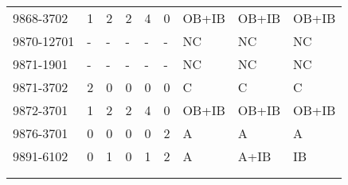 \begin{longtable}{p{2.1cm}p{0.8cm}p{0.8cm}p{0.8cm}p{0.8cm}p{0.8cm}p{1.5cm}p{1.5cm}p{1.2cm}}
9868-3702 & 1 & 2 & 2 & 4 & 0 & OB+IB & OB+IB & OB+IB \\
9870-12701 & - & - & - & - & - & NC & NC & NC \\
9871-1901 & - & - & - & - & - & NC & NC & NC \\
9871-3702 & 2 & 0 & 0 & 0 & 0 & C & C & C \\
9872-3701 & 1 & 2 & 2 & 4 & 0 & OB+IB & OB+IB & OB+IB \\
9876-3701 & 0 & 0 & 0 & 0 & 2 & A & A & A \\
9891-6102 & 0 & 1 & 0 & 1 & 2 & A & A+IB & IB \\
 &  &  &  &  &  &  &  &  \\
 &  &  &  &  &  &  &  & 
\end{longtable}
